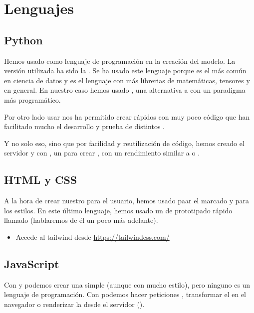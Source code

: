 
\section{Lenguajes}

\subsection{Python}

Hemos usado  como lenguaje de programación en la creación del modelo. La versión utilizada ha sido la . Se ha usado este lenguaje porque es el más común en ciencia de datos y es el lenguaje con más librerias de matemáticas, tensores y  en general. En nuestro caso hemos usado , una alternativa a  con un paradigma más programático.

Por otro lado usar  nos ha permitido crear  rápidos con muy poco código que han facilitado mucho el desarrollo y prueba de distintos .

Y no solo eso, sino que por facilidad y reutilización de código, hemos creado el servidor y  con , un  para crear , con un rendimiento similar a  o  .

\subsection{HTML y CSS}

A la hora de crear nuestro  para el usuario, hemos usado  paar el marcado y  para los estilos. En este último lenguaje, hemos usado un  de prototipado rápido llamado  (hablaremos de él un poco más adelante).

\begin{itemize}
  \item Accede al  tailwind desde \url{https://tailwindcss.com/}
\end{itemize}

\subsection{JavaScript}

Con  y  podemos crear una  simple (aunque con mucho estilo), pero ninguno es un lenguaje de programación. Con  podemos hacer peticiones , transformar el  en el navegador o renderizar la  desde el servidor ().

